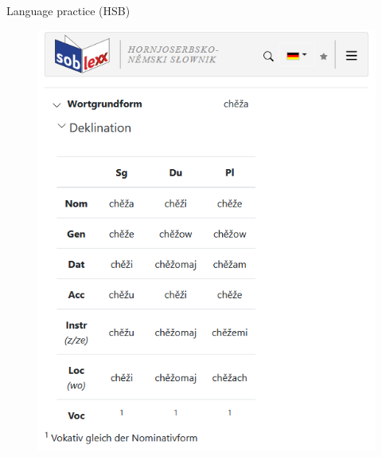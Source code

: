 \begin{block}{Language practice (HSB)}
    \begin{figure}
        \centering
        \includegraphics[width=0.7\colwidth]{soblex_klein.png}
        \label{fig:soblex}
    \end{figure}

  \end{block}
